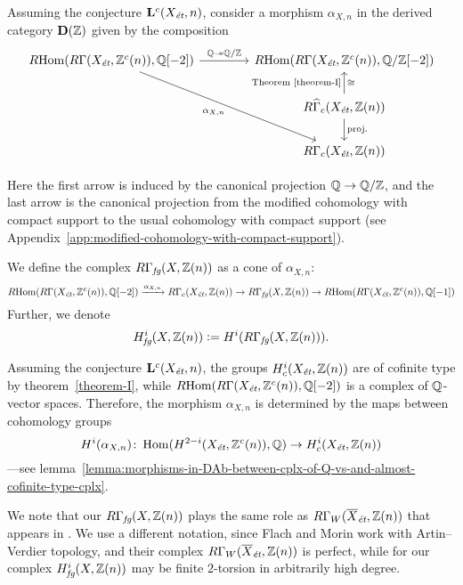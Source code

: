 \documentclass{article}
\numberwithin{equation}{section}
\begin{document}
\begin{definition}
  \label{def:RGamma-fg}
  Assuming the conjecture $\mathbf{L}^c (X_\et,n)$, consider a morphism
  $\alpha_{X,n}$ in the derived category $\mathbf{D} (\ZZ)$ given by the
  composition
  \[ \begin{tikzcd}[column sep=4em]
    \RHom (R\Gamma (X_\et, \ZZ^c (n)), \QQ[-2]) \ar{r}{\QQ \twoheadrightarrow \QQ/\ZZ}\ar{ddr}[swap]{\alpha_{X,n}} & \RHom (R\Gamma (X_\et, \ZZ^c (n)), \QQ/\ZZ[-2]) \\
    & R\widehat{\Gamma}_c (X_\et, \ZZ (n)) \ar{u}{\text{Theorem \ref{theorem-I}}}[swap]{\cong} \ar{d}{\text{proj.}} \\
    & R\Gamma_c (X_\et, \ZZ (n))
  \end{tikzcd} \]

  Here the first arrow is induced by the canonical projection $\QQ \to \QQ/\ZZ$,
  and the last arrow is the canonical projection from the modified cohomology
  with compact support to the usual cohomology with compact support
  (see Appendix~\ref{app:modified-cohomology-with-compact-support}).

  We define the complex $R\Gamma_\fg (X, \ZZ(n))$ as a cone of $\alpha_{X,n}$:
  \[ \RHom (R\Gamma (X_\et, \ZZ^c (n)), \QQ [-2]) \xrightarrow{\alpha_{X,n}}
    R\Gamma_c (X_\et, \ZZ (n)) \to
    R\Gamma_\fg (X, \ZZ(n)) \to
    \RHom (R\Gamma (X_\et, \ZZ^c (n)), \QQ [-1]) \]
  Further, we denote
  $$H^i_\fg (X, \ZZ (n)) \dfn H^i (R\Gamma_\fg (X, \ZZ (n))).$$
\end{definition}

\begin{remark}
  \label{rmk:alpha-X-n-determined-by-cohomology}
  Assuming the conjecture $\mathbf{L}^c (X_\et, n)$, the groups
  $H^i_c (X_\et, \ZZ (n))$ are of cofinite type by theorem~\ref{theorem-I},
  while $\RHom (R\Gamma (X_\et, \ZZ^c (n)), \QQ [-2])$ is a complex of
  $\QQ$-vector spaces. Therefore, the morphism $\alpha_{X,n}$ is determined by
  the maps between cohomology groups
  \[ H^i (\alpha_{X,n})\colon
    \Hom (H^{2-i} (X_\et, \ZZ^c (n)), \QQ) \to
    H^i_c (X_\et, \ZZ (n)) \]
  ---see lemma~\ref{lemma:morphisms-in-DAb-between-cplx-of-Q-vs-and-almost-cofinite-type-cplx}.
\end{remark}

\begin{remark}
  We note that our $R\Gamma_\fg (X, \ZZ (n))$ plays the same role as
  $R\Gamma_W (\overline{X}_\et, \ZZ (n))$ that appears in
  \cite[Definition~3.6]{Flach-Morin-2018}. We use a different notation, since
  Flach and Morin work with Artin--Verdier topology, and their complex
  $R\Gamma_W (\overline{X}_\et, \ZZ (n))$ is perfect, while for our complex
  $H^i_\fg (X, \ZZ (n))$ may be finite $2$-torsion in arbitrarily high degree.
\end{remark}
\end{document}

